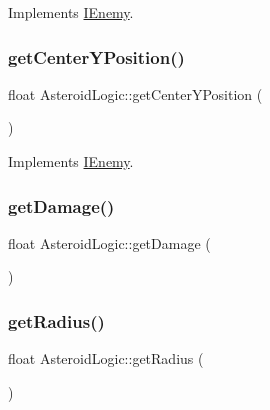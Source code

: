 Implements \hyperlink{class_i_enemy_ab5bc39484a8aeaf278c3d127ec5d9545}{I\+Enemy}.

\mbox{\label{class_asteroid_logic_a00c9cda893b9dee7e2225377dd54a2eb}} 
\subsubsection{\texorpdfstring{get\+Center\+Y\+Position()}{getCenterYPosition()}}
{\footnotesize\ttfamily float Asteroid\+Logic\+::get\+Center\+Y\+Position (\begin{DoxyParamCaption}{ }\end{DoxyParamCaption})\hspace{0.3cm}{\ttfamily [virtual]}}



Implements \hyperlink{class_i_enemy_ac9a2d69103fa86d8344aa368fb33c714}{I\+Enemy}.

\mbox{\label{class_asteroid_logic_abe3018168bb1a91b78aac410a3cb7853}} 
\subsubsection{\texorpdfstring{get\+Damage()}{getDamage()}}
{\footnotesize\ttfamily float Asteroid\+Logic\+::get\+Damage (\begin{DoxyParamCaption}{ }\end{DoxyParamCaption})}

\mbox{\label{class_asteroid_logic_a575d9f801770906960b65dafe937fba5}} 
\subsubsection{\texorpdfstring{get\+Radius()}{getRadius()}}
{\footnotesize\ttfamily float Asteroid\+Logic\+::get\+Radius (\begin{DoxyParamCaption}{ }\end{DoxyParamCaption})\hspace{0.3cm}{\ttfamily [virtual]}}



